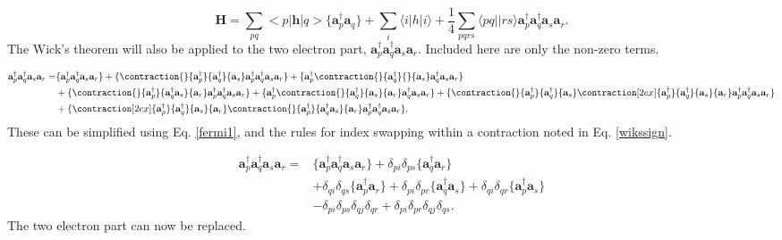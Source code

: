 \begin{equation}
\textbf{H} = \sum_{pq} <p|\textbf{h}|q> 
\{\textbf{a}^{\dag}_p \textbf{a}_q \}
+ \sum_i \langle i|h|i \rangle
 + 
\frac{1}{4} \sum_{pqrs} \langle pq||rs \rangle \textbf{a}^{\dag}_p \textbf{a}^{\dag}_q \textbf{a}_s \textbf{a}_r . \label{temp_h}
\end{equation}
The Wick's theorem will also be applied to the two electron part, $\textbf{a}^{\dag}_p \textbf{a}^{\dag}_q \textbf{a}_s \textbf{a}_r$. Included here are only the non-zero terms.

\begin{align}
\textbf{a}^{\dag}_p \textbf{a}^{\dag}_q \textbf{a}_s \textbf{a}_r = & \{\textbf{a}^{\dag}_p \textbf{a}^{\dag}_q \textbf{a}_s \textbf{a}_r\} 
+ \{
\contraction{}{\textbf{a}^{\dag}_p}{\textbf{a}^{\dag}_q}{\textbf{a}_s}
\textbf{a}^{\dag}_p \textbf{a}^{\dag}_q \textbf{a}_s 
\textbf{a}_r
\}
+ \{
\textbf{a}^{\dag}_p
\contraction{}{\textbf{a}^{\dag}_q}{}{\textbf{a}_s}
\textbf{a}^{\dag}_q \textbf{a}_s 
\textbf{a}_r
\} \nonumber \\ &
+ \{
\contraction{}{\textbf{a}^{\dag}_p}{\textbf{a}^{\dag}_q \textbf{a}_s}{\textbf{a}_r}
\textbf{a}^{\dag}_p \textbf{a}^{\dag}_q \textbf{a}_s 
\textbf{a}_r
\}
+ \{\textbf{a}^{\dag}_p
\contraction{}{\textbf{a}^{\dag}_q}{\textbf{a}_s}{\textbf{a}_r}
\textbf{a}^{\dag}_q \textbf{a}_s \textbf{a}_r
\}
+ \{
\contraction{}{\textbf{a}^{\dag}_p}{\textbf{a}^{\dag}_q}{\textbf{a}_s}
\contraction[2ex]{\textbf{a}^{\dag}_p}{\textbf{a}^{\dag}_q}{\textbf{a}_s}{\textbf{a}_r}
\textbf{a}^{\dag}_p \textbf{a}^{\dag}_q \textbf{a}_s 
\textbf{a}_r
\} \nonumber \\ &
+ \{
\contraction[2ex]{\textbf{a}^{\dag}_p}{\textbf{a}^{\dag}_q}{\textbf{a}_s}{\textbf{a}_r}
\contraction{}{\textbf{a}^{\dag}_p}{\textbf{a}^{\dag}_q \textbf{a}_s}{\textbf{a}_r}
\textbf{a}^{\dag}_p \textbf{a}^{\dag}_q \textbf{a}_s 
\textbf{a}_r
\} . \nonumber
\end{align}
These can be simplified using Eq. \eqref{fermi1}, and the rules for index swapping within a contraction noted in Eq. \eqref{wikssign}.

\begin{align}
\textbf{a}^{\dag}_p \textbf{a}^{\dag}_q \textbf{a}_s \textbf{a}_r = &\{\textbf{a}^{\dag}_p \textbf{a}^{\dag}_q \textbf{a}_s \textbf{a}_r\} 
+ \delta_{pi} \delta_{ps} \{ \textbf{a}^{\dag}_q \textbf{a}_r \}
\nonumber \\ & 
+ \delta_{qi} \delta_{qs}
\{ \textbf{a}^{\dag}_p \textbf{a}_r \}
+ \delta_{pi} \delta_{pr} 
\{ \textbf{a}^{\dag}_q \textbf{a}_s \}
+ \delta_{qi} \delta_{qr}
\{ \textbf{a}^{\dag}_p \textbf{a}_s \} \nonumber \\ &
- \delta_{pi} \delta_{ps} \delta_{qj} \delta_{qr}
+ \delta_{pi} \delta_{pr} \delta_{qj} \delta_{qs} .
\end{align}
The two electron part can now be replaced.

